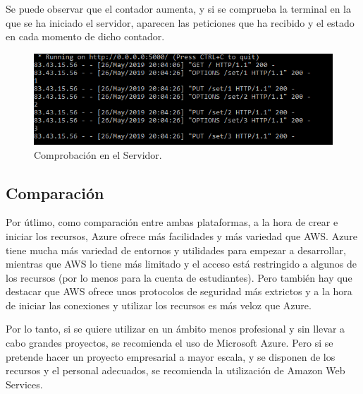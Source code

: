 \documentclass[10pt]{article}
\begin{document}
Se puede observar que el contador aumenta, y si se comprueba la terminal en la que
se ha iniciado el servidor, aparecen las peticiones que ha recibido y el estado en
cada momento de dicho contador.

\begin{figure}[h!]
 \includegraphics[width=\linewidth]{./Web/Azure/Comprobacion.png}
 \caption{Comprobación en el Servidor.}
\end{figure}

\subsection{Comparación}

Por útlimo, como comparación entre ambas plataformas, a la hora de crear e iniciar
los recursos, Azure ofrece más facilidades y más variedad que AWS. Azure tiene
mucha más variedad de entornos y utilidades para empezar a desarrollar, mientras
que AWS lo tiene más limitado y el acceso está restringido a algunos de los
recursos (por lo menos para la cuenta de estudiantes). Pero también hay que
destacar que AWS ofrece unos protocolos de seguridad más extrictos y a la hora de
iniciar las conexiones y utilizar los recursos es más veloz que Azure.

Por lo tanto, si se quiere utilizar en un ámbito menos profesional y sin llevar a
cabo grandes proyectos, se recomienda el uso de Microsoft Azure. Pero si se
pretende hacer un proyecto empresarial a mayor escala, y se disponen de los
recursos y el personal adecuados, se recomienda la utilización de Amazon Web
Services.
\end{document}
